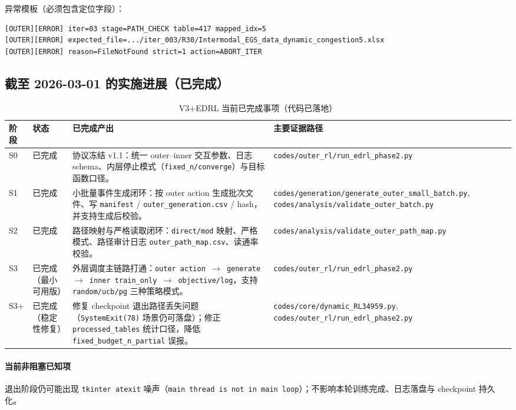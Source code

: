 \documentclass[UTF8,11pt,a4paper]{ctexart}
\begin{document}
异常模板（必须包含定位字段）：
\begin{verbatim}
[OUTER][ERROR] iter=03 stage=PATH_CHECK table=417 mapped_idx=5
[OUTER][ERROR] expected_file=.../iter_003/R30/Intermodal_EGS_data_dynamic_congestion5.xlsx
[OUTER][ERROR] reason=FileNotFound strict=1 action=ABORT_ITER
\end{verbatim}

\subsection{截至 2026-03-01 的实施进展（已完成）}
\begin{table}[H]
\centering
\caption{V3+EDRL 当前已完成事项（代码已落地）}
\begin{tabular}{p{1.4cm}p{2.2cm}p{7.2cm}p{3.8cm}}
\toprule
阶段 & 状态 & 已完成产出 & 主要证据路径 \\
\midrule
S0 & 已完成 & 协议冻结 v1.1：统一 outer--inner 交互参数、日志 schema、内层停止模式（\texttt{fixed\_n/converge}）与目标函数口径。 & \texttt{codes/outer\_rl/run\_edrl\_phase2.py} \\
S1 & 已完成 & 小批量事件生成闭环：按 outer action 生成批次文件、写 \texttt{manifest} / \texttt{outer\_generation.csv} / hash，并支持生成后校验。 & \texttt{codes/generation/generate\_outer\_small\_batch.py}, \texttt{codes/analysis/validate\_outer\_batch.py} \\
S2 & 已完成 & 路径映射与严格读取闭环：\texttt{direct/mod} 映射、严格模式、路径审计日志 \texttt{outer\_path\_map.csv}、读通率校验。 & \texttt{codes/analysis/validate\_outer\_path\_map.py} \\
S3 & 已完成（最小可用版） & 外层调度主链路打通：\texttt{outer action $\rightarrow$ generate $\rightarrow$ inner train\_only $\rightarrow$ objective/log}，支持 \texttt{random/ucb/pg} 三种策略模式。 & \texttt{codes/outer\_rl/run\_edrl\_phase2.py} \\
S3+ & 已完成（稳定性修复） & 修复 checkpoint 退出路径丢失问题（\texttt{SystemExit(78)} 场景仍可落盘）；修正 \texttt{processed\_tables} 统计口径，降低 \texttt{fixed\_budget\_n\_partial} 误报。 & \texttt{codes/core/dynamic\_RL34959.py}, \texttt{codes/outer\_rl/run\_edrl\_phase2.py} \\
\bottomrule
\end{tabular}
\end{table}

\paragraph{当前非阻塞已知项}
退出阶段仍可能出现 \texttt{tkinter atexit} 噪声（\texttt{main thread is not in main loop}）；不影响本轮训练完成、日志落盘与 checkpoint 持久化。
\end{document}
